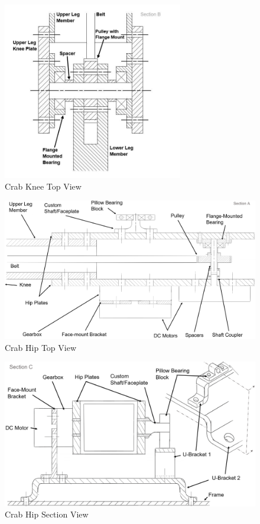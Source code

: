 \begin{figure}
    \centering
    \includegraphics[width=0.7\textwidth]{2_DesignSolution/img/crab_knee.JPG}
    \caption{Crab Knee Top View}
    \label{fig:crab_knee}
\end{figure}

\begin{figure}
    \centering
    \includegraphics[width=\textwidth]{2_DesignSolution/img/crab_hip.png}
    \caption{Crab Hip Top View}
    \label{fig:crab_hip}
\end{figure}

\begin{figure}
    \centering
    \includegraphics[width=\textwidth]{2_DesignSolution/img/crab_hip_cut.png}
    \caption{Crab Hip Section View}
    \label{fig:crab_hip_section}
\end{figure}
